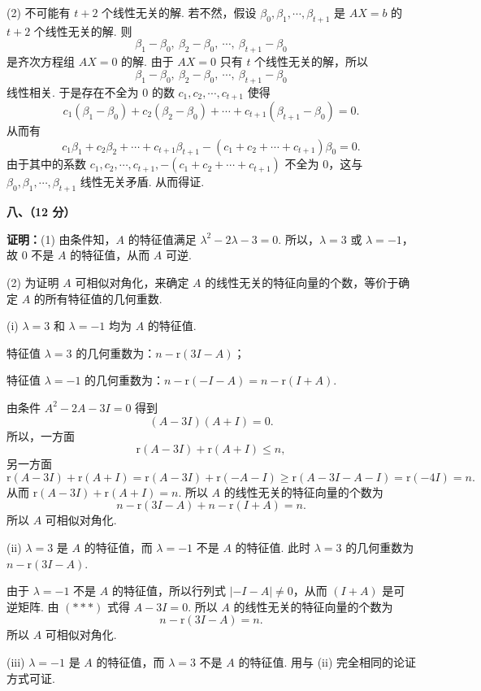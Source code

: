 \documentclass[a4paper,11pt]{ctexart}
\newcommand{\rk}{\mathrm{r}}
\begin{document}
(2) 不可能有 $t + 2$ 个线性无关的解. 若不然，假设 $\beta_0, \beta_1, \cdots, \beta_{t+1}$ 是 $AX = b$ 的 $t + 2$ 个线性无关的解. 则
\[
  \beta_1 - \beta_0,\ \beta_2 - \beta_0,\ \cdots,\ \beta_{t+1} - \beta_0
\]
是齐次方程组 $AX = 0$ 的解. 由于 $AX = 0$ 只有 $t$ 个线性无关的解，所以
\[
  \beta_1 - \beta_0,\ \beta_2 - \beta_0,\ \cdots,\ \beta_{t+1} - \beta_0
\]
线性相关. 于是存在不全为 $0$ 的数 $c_1, c_2, \cdots, c_{t+1}$ 使得
\[
  c_1(\beta_1 - \beta_0) + c_2(\beta_2 - \beta_0) + \cdots + c_{t+1}(\beta_{t+1} - \beta_0) = 0.
\]
从而有
\[
  c_1 \beta_1 + c_2 \beta_2 + \cdots + c_{t+1} \beta_{t+1} - (c_1 + c_2 + \cdots + c_{t+1})\beta_0 = 0.
\]
由于其中的系数 $c_1, c_2, \cdots, c_{t+1}, -(c_1 + c_2 + \cdots + c_{t+1})$ 不全为 $0$，这与 $\beta_0, \beta_1, \cdots, \beta_{t+1}$ 线性无关矛盾. 从而得证.

\vspace{0.8em}

\textbf{八、（12 分）}

\textbf{证明：}(1) 由条件知，$A$ 的特征值满足 $\lambda^2 - 2\lambda - 3 = 0$. 所以，$\lambda = 3$ 或 $\lambda = -1$，故 $0$ 不是 $A$ 的特征值，从而 $A$ 可逆.

(2) 为证明 $A$ 可相似对角化，来确定 $A$ 的线性无关的特征向量的个数，等价于确定 $A$ 的所有特征值的几何重数.

(i) $\lambda = 3$ 和 $\lambda = -1$ 均为 $A$ 的特征值.

特征值 $\lambda = 3$ 的几何重数为：$n - \rk(3I - A)$；

特征值 $\lambda = -1$ 的几何重数为：$n - \rk(-I - A) = n - \rk(I + A)$.

由条件 $A^2 - 2A - 3I = 0$ 得到
\begin{equation*}
  (A - 3I)(A + I) = 0. \tag{$***$}
\end{equation*}
所以，一方面
\[
  \rk(A - 3I) + \rk(A + I) \leqslant n,
\]
另一方面
\[
  \rk(A - 3I) + \rk(A + I) = \rk(A - 3I) + \rk(-A - I) \geqslant \rk(A - 3I - A - I) = \rk(-4I) = n.
\]
从而 $\rk(A - 3I) + \rk(A + I) = n$. 所以 $A$ 的线性无关的特征向量的个数为
\[
  n - \rk(3I - A) + n - \rk(I + A) = n.
\]
所以 $A$ 可相似对角化.

(ii) $\lambda = 3$ 是 $A$ 的特征值，而 $\lambda = -1$ 不是 $A$ 的特征值. 此时 $\lambda = 3$ 的几何重数为 $n - \rk(3I - A)$.

由于 $\lambda = -1$ 不是 $A$ 的特征值，所以行列式 $|-I - A| \neq 0$，从而 $(I + A)$ 是可逆矩阵. 由 $(***)$ 式得 $A - 3I = 0$. 所以 $A$ 的线性无关的特征向量的个数为
\[
  n - \rk(3I - A) = n.
\]
所以 $A$ 可相似对角化.

(iii) $\lambda = -1$ 是 $A$ 的特征值，而 $\lambda = 3$ 不是 $A$ 的特征值. 用与 (ii) 完全相同的论证方式可证.
\end{document}
